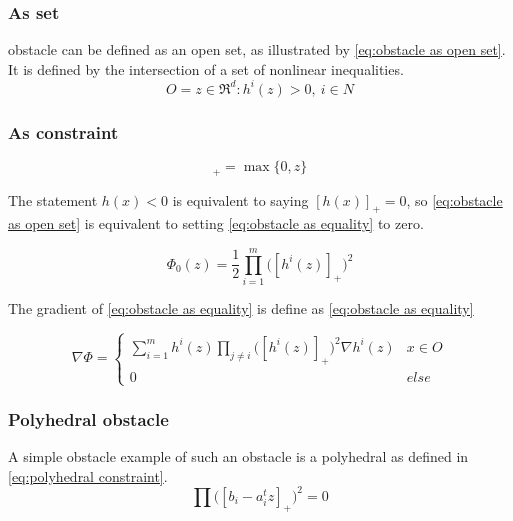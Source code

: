 			\subsubsection{As set}
				 obstacle can be defined as an open set, as illustrated by \eqref{eq:obstacle as open set}. It is defined by the intersection of a set of nonlinear inequalities.
				\begin{equation}
					O = {z \in \Re^d : h^i(z)>0,\ i \in N}
					\label{eq:obstacle as open set}
				\end{equation}
				
			\subsubsection{As constraint}
				\begin{equation}
					[z]_+ =  \max\{0,z\}
				\end{equation}
				
				The statement $h(x)<0$ is equivalent to saying $[h(x)]_+=0$, so \eqref{eq:obstacle as open set} is equivalent to setting \eqref{eq:obstacle as equality} to zero.
				
				\begin{equation}
					\Phi_0(z) =  \frac{1}{2} \prod_{i=1}^m \Big( [h^i(z)]_+ \Big)^2
					\label{eq:obstacle as equality}
				\end{equation}
				
				The gradient of \eqref{eq:obstacle as equality} is define as \eqref{eq:obstacle as equality}
				
				\begin{equation}
					\nabla \Phi =
					\begin{cases}
						\sum_{i=1}^{m} h^i(z)\prod_{j \ne i} \Big( [h^i(z)]_+ \Big)^2 \nabla h^i(z)
						& x \in O \\
						0 & else
					\end{cases}
					\label{eq:derivative obstacle as equality}
				\end{equation}
			
			\subsubsection{Polyhedral obstacle}
				A simple obstacle example of such an obstacle is a polyhedral as defined in \eqref{eq:polyhedral constraint}.
				\begin{equation}
					\prod \Big([b_i - a_i^t z]_+ \Big)^2 = 0
					\label{eq:polyhedral constraint}
				\end{equation}
			
